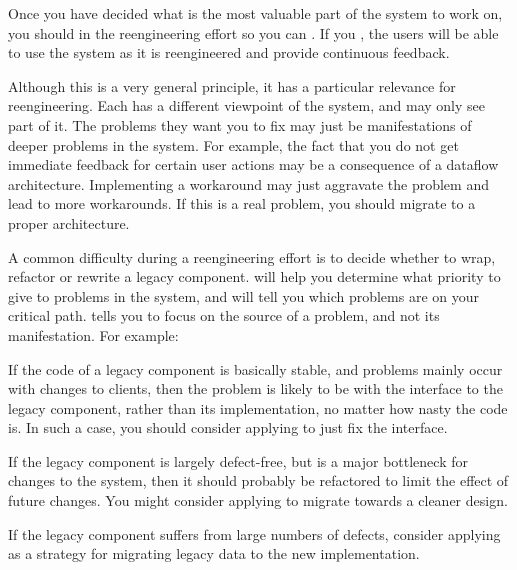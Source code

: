 \documentclass[a4paper,10pt,twoside]{book}
\begin{document}
Once you have decided what is the most valuable part of the system to work on, you should  in the reengineering effort so you can . If you , the users will be able to use the system as it is reengineered and provide continuous feedback.




\discussion
Although this is a very general principle, it has a particular relevance for reengineering. Each  has a different viewpoint of the system, and may only see part of it. The problems they want you to fix may just be manifestations of deeper problems in the system. For example, the fact that you do not get immediate feedback for certain user actions may be a consequence of a dataflow architecture. Implementing a workaround may just aggravate the problem and lead to more workarounds. If this is a real problem, you should migrate to a proper architecture.

A common difficulty during a reengineering effort is to decide whether to wrap, refactor or rewrite a legacy component.  will help you determine what priority to give to problems in the system, and will tell you which problems are on your critical path.  tells you to focus on the source of a problem, and not its manifestation. For example:

\begin{bulletlist}
  \item If the code of a legacy component is basically stable, and problems mainly occur with changes to clients, then the problem is likely to be with the interface to the legacy component, rather than its implementation, no matter how nasty the code is. In such a case, you should consider applying  to just fix the interface.

  \item If the legacy component is largely defect-free, but is a major bottleneck for changes to the system, then it should probably be refactored to limit the effect of future changes. You might consider applying  to migrate towards a cleaner design.

  \item If the legacy component suffers from large numbers of defects, consider applying  as a strategy for migrating legacy data to the new implementation.

\end{bulletlist}
\end{document}
